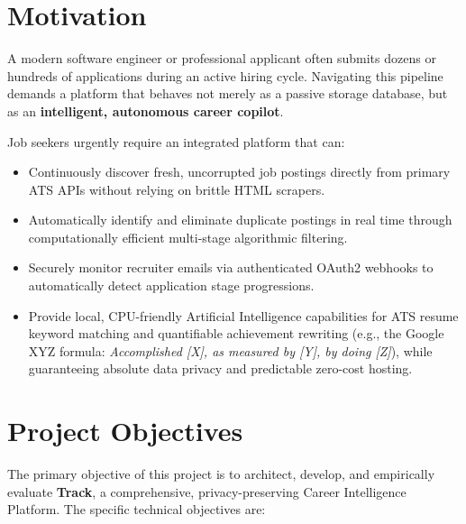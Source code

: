 \section{Motivation}
A modern software engineer or professional applicant often submits dozens or hundreds of applications during an active hiring cycle. Navigating this pipeline demands a platform that behaves not merely as a passive storage database, but as an \textbf{intelligent, autonomous career copilot}.

Job seekers urgently require an integrated platform that can:
\begin{itemize}
    \item Continuously discover fresh, uncorrupted job postings directly from primary ATS APIs without relying on brittle HTML scrapers.
    \item Automatically identify and eliminate duplicate postings in real time through computationally efficient multi-stage algorithmic filtering.
    \item Securely monitor recruiter emails via authenticated OAuth2 webhooks to automatically detect application stage progressions.
    \item Provide local, CPU-friendly Artificial Intelligence capabilities for ATS resume keyword matching and quantifiable achievement rewriting (e.g., the Google XYZ formula: \textit{Accomplished [X], as measured by [Y], by doing [Z]}), while guaranteeing absolute data privacy and predictable zero-cost hosting.
\end{itemize}

\section{Project Objectives}
The primary objective of this project is to architect, develop, and empirically evaluate \textbf{Track}, a comprehensive, privacy-preserving Career Intelligence Platform. The specific technical objectives are:

